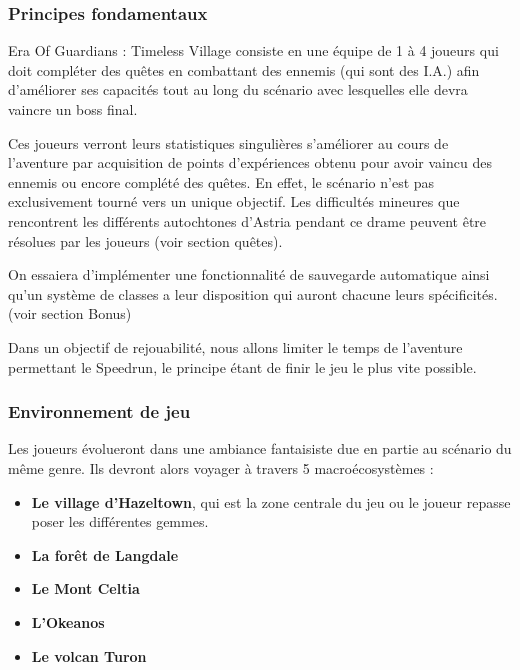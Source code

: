 \documentclass[12pt]{article}
\begin{document}
                

            \subsubsection{Principes fondamentaux}
            
                Era Of Guardians : Timeless Village consiste en une équipe de 1 à 4 joueurs qui doit compléter des quêtes en combattant des ennemis (qui sont des I.A.) afin d'améliorer ses capacités tout au long du scénario avec lesquelles elle devra vaincre un boss final. 
                \par Ces joueurs verront leurs statistiques singulières s'améliorer au cours de l'aventure par acquisition de points d'expériences obtenu pour avoir vaincu des ennemis ou encore complété des quêtes. En effet, le scénario n'est pas exclusivement tourné vers un unique objectif. Les difficultés mineures que rencontrent les différents autochtones d'Astria pendant ce drame peuvent être résolues par les joueurs (voir section quêtes).
                
                On essaiera d'implémenter une fonctionnalité de sauvegarde automatique ainsi qu'un système de classes a leur disposition qui auront chacune leurs spécificités. (voir section Bonus)
                
                Dans un objectif de rejouabilité, nous allons limiter le temps de l'aventure permettant le Speedrun, le principe étant de finir le jeu le plus vite possible.
        \clearpage
            \subsubsection{Environnement de jeu}
            
                Les joueurs évolueront dans une ambiance fantaisiste due en partie au scénario du même genre. Ils devront alors voyager à travers 5 macroécosystèmes :
                \begin{itemize} 
                    \setlength{\itemindent}{2em}
                    \item \textbf{Le village d'Hazeltown}, qui est la zone centrale du jeu ou le joueur repasse poser les différentes gemmes.
                    \item \textbf{La forêt de Langdale}
                    \item \textbf{Le Mont Celtia}
                    \item \textbf{L'Okeanos}
                    \item \textbf{Le volcan Turon}
                \end{itemize}
\end{document}
